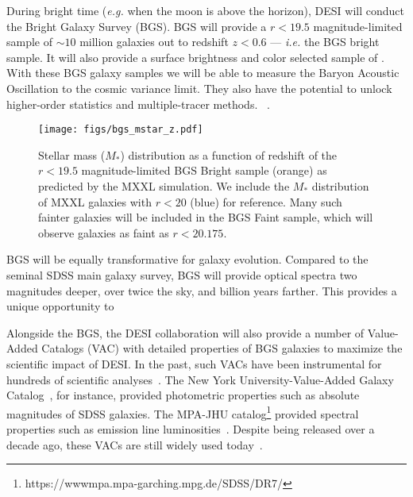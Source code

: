 During bright time (\emph{e.g.} when the moon is above the horizon), DESI will
conduct the Bright Galaxy Survey (BGS). 
BGS will provide a $r < 19.5$ magnitude-limited sample of ${\sim}10$ million
galaxies out to redshift $z < 0.6$ --- \emph{i.e.} the BGS bright sample. 
It will also provide a surface brightness and color selected sample of 
. 
With these BGS galaxy samples we will be able to measure the Baryon Acoustic
Oscillation to the cosmic variance limit. 
They also have the potential to unlock higher-order statistics and
multiple-tracer methods. 
~\citep{desicollaboration2016,
desicollaboration2016a}.


\begin{figure}
\begin{center}
    \texttt{[image: figs/bgs\_mstar\_z.pdf]}
    \caption{
        Stellar mass ($M_*$) distribution as a function of redshift of the $r < 19.5$
        magnitude-limited BGS Bright sample (orange) as predicted by the MXXL
        simulation. 
        We include the $M_*$ distribution of MXXL galaxies with $r < 20$ (blue)
        for reference.
        Many such fainter galaxies will be included in the BGS Faint sample,
        which will observe galaxies as faint as $r < 20.175$. }\label{fig:bgs_mstar}
\end{center}
\end{figure}

BGS will be equally transformative for galaxy evolution. 
Compared to the seminal SDSS main galaxy survey, BGS will provide optical
spectra two magnitudes deeper, over twice the sky, and  billion years
farther. 
This provides a unique opportunity to 

Alongside the BGS, the DESI collaboration will also provide a number of
Value-Added Catalogs (VAC) with detailed properties of BGS galaxies to maximize
the scientific impact of DESI. 
In the past, such VACs have been instrumental for hundreds of scientific
analyses~\citep[see][for a review]{blanton2009}. 
The New York University-Value-Added Galaxy
Catalog~\citep[NYU-VAGC][]{blanton2005}, for instance, provided photometric
properties such as absolute magnitudes of SDSS galaxies. 
The MPA-JHU catalog\footnote{https://wwwmpa.mpa-garching.mpg.de/SDSS/DR7/}
provided spectral properties such as emission line
luminosities~\cite{brinchmann2004}.
Despite being released over a decade ago, these VACs are still widely used
today~\citep[\emph{e.g.}][]{alpaslan2021}. 


